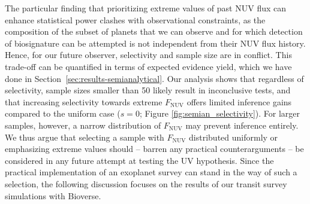 \documentclass[twocolumn,twocolappendix,linenumbers]{aastex631}
\begin{document}
The particular finding that prioritizing extreme values of past \gls{NUV} flux can enhance statistical power clashes with observational constraints, as the composition of the subset of planets that we can observe and for which detection of biosignature can be attempted is not independent from their \gls{NUV} flux history.
Hence, for our future observer, selectivity and sample size are in conflict.
This trade-off can be quantified in terms of expected evidence yield, which we have done in Section~\ref{sec:results-semianalytical}.
Our analysis shows that regardless of selectivity, sample sizes smaller than 50 likely result in inconclusive tests, and that increasing selectivity towards extreme $F_{\mathrm{NUV}}$ offers limited inference gains compared to the uniform case ($s=0$; Figure \ref{fig:semian_selectivity}).
For larger samples, however, a narrow distribution of $F_{\mathrm{NUV}}$ may prevent inference entirely.
We thus argue that selecting a sample with $F_{\mathrm{NUV}}$ distributed uniformly or emphasizing extreme values should -- barren any practical counterarguments -- be considered in any future attempt at testing the UV hypothesis.
Since the practical implementation of an exoplanet survey can stand in the way of such a selection, the following discussion focuses on the results of our transit survey simulations with Bioverse.

\end{document}
